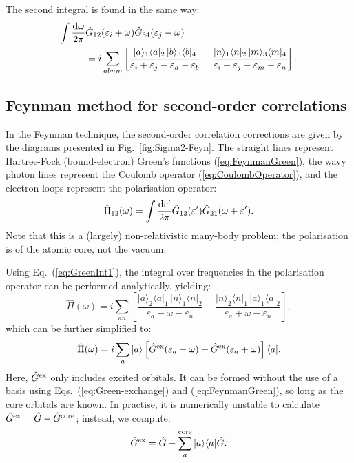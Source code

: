 \documentclass[10pt,twocolumn,a4paper]{article}%
\newcommand{\bra}[1]{\ensuremath{\langle #1|}}	%
\newcommand{\ket}[1]{\ensuremath{|#1\rangle}}	%
\newcommand{\be}{\begin{equation}}
\newcommand{\ee}{\end{equation}}
\def\d{\ensuremath{{\rm d}}}
\def\en{\ensuremath{\varepsilon}}
\newcommand{\w}{\ensuremath{\omega}}
\begin{document}
The second integral is found in the same way:
\begin{align}
\int \frac{\d \w}{2\pi}&\hat G_{12}(\en_i+\w) \hat G_{34}(\en_j - \omega)\notag\\
&=
i\sum_{abnm}\left[
\frac{\ket{a}_1\bra{a}_2 \, \ket{b}_3\bra{b}_4}{\en_i+\en_j - \en_a - \en_b}
-
\frac{\ket{n}_1\bra{n}_2 \, \ket{m}_3\bra{m}_4}{\en_i + \en_j - \en_m - \en_n}
\right].
\label{eq:GreenInt2}
\end{align}




\subsection{Feynman method for second-order correlations}



In the Feynman technique, the second-order correlation corrections are given by the diagrams presented in Fig.~\ref{fig:Sigma2-Feyn}.
The straight lines represent Hartree-Fock (bound-electron) Green's functions (\ref{eq:FeynmanGreen}),
the wavy photon lines represent the Coulomb operator (\ref{eq:CoulombOperator}),
and the electron loops represent the polarisation operator:
\be\label{eq:PolarisationOperator}
\hat\Pi_{12}(\w) = \int \frac{\d \en'}{2\pi}\hat  G_{12}(\en') \hat G_{21}(\w+\en') .
\ee
Note that this is a (largely) non-relativistic many-body problem; the polarisation is of the atomic core, not the vacuum.



Using Eq.~(\ref{eq:GreenInt1}), the integral over frequencies in the polarisation operator can be performed analytically, yielding:
\be\label{eq:PiGreen2}
\hat\Pi(\w) = i\sum_{an}\left[
\frac{\ket{a}_2\bra{a}_1 \, \ket{n}_1\bra{n}_2}{\en_a-\w-\en_n}
+
\frac{\ket{n}_2\bra{n}_1 \, \ket{a}_1\bra{a}_2}{\en_a+\w-\en_n}
\right],
\ee
which can be further simplified to:
\be\label{eq:PiGreen}
\hat\Pi(\w) = i\sum_a \ket{a}\left[\hat G^{\rm ex}(\en_a -\w) +  \hat G^{\rm ex}(\en_a +\w)\right]\bra{a}.
\ee
Here, $\hat G^{\rm ex}$ only includes excited orbitals. It can be formed without the use of a basis using Eqs.~(\ref{eq:Green-exchange}) and (\ref{eq:FeynmanGreen}), so long as the core orbitals are known.
In practise, it is numerically unstable to calculate $\hat G^{\rm ex} = \hat G-\hat G^{\rm core}$; instead, we compute:
\be\label{eq:Gex}
\hat G^{\rm ex} =  \hat G - \sum_a^{\rm core} \ket{a}\bra{a}\hat G.
\ee
\end{document}
